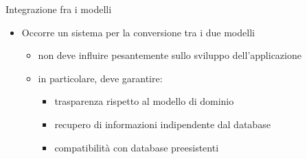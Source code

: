 \begin{frame}{Integrazione fra i modelli}

\begin{itemize}
\item Occorre un sistema per la conversione tra i due modelli

	\begin{itemize}
	
	\vspace{0.7em}
	
	\item non deve influire pesantemente sullo sviluppo dell'applicazione
	
	\vspace{0.7em}
	
	\item in particolare, deve garantire:
	
		\begin{itemize}
		\item trasparenza rispetto al modello di dominio
		
		\vspace{0.5em}
		
		\item recupero di informazioni indipendente dal database
		
		\vspace{0.5em}
		
		\item compatibilità con database preesistenti
		\end{itemize}
	
	\end{itemize}

\end{itemize}

\end{frame}


